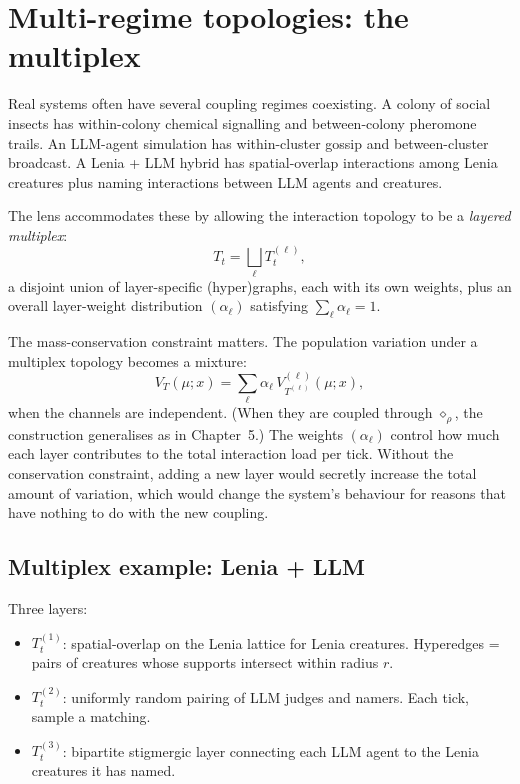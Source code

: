 \section{Multi-regime topologies: the multiplex}

Real systems often have several coupling regimes coexisting. A colony
of social insects has within-colony chemical signalling and
between-colony pheromone trails. An LLM-agent simulation has
within-cluster gossip and between-cluster broadcast. A Lenia + LLM
hybrid has spatial-overlap interactions among Lenia creatures plus
naming interactions between LLM agents and creatures.

The lens accommodates these by allowing the interaction topology to
be a \emph{layered multiplex}:
\[
  T_t = \bigsqcup_\ell T_t^{(\ell)},
\]
a disjoint union of layer-specific (hyper)graphs, each with its own
weights, plus an overall layer-weight distribution $(\alpha_\ell)$
satisfying $\sum_\ell \alpha_\ell = 1$.

The mass-conservation constraint matters. The population variation
under a multiplex topology becomes a mixture:
\[
  V_T(\mu; x) = \sum_\ell \alpha_\ell\, V_{T^{(\ell)}}^{(\ell)}(\mu;
  x),
\]
when the channels are independent. (When they are coupled through
$\diamond_\rho$, the construction generalises as in Chapter~5.) The
weights $(\alpha_\ell)$ control how much each layer contributes to the
total interaction load per tick. Without the conservation constraint,
adding a new layer would secretly increase the total amount of
variation, which would change the system's behaviour for reasons that
have nothing to do with the new coupling.

\subsection*{Multiplex example: Lenia + LLM}

Three layers:

\begin{itemize}[leftmargin=1.5em,itemsep=2pt]
  \item $T_t^{(1)}$: spatial-overlap on the Lenia lattice for Lenia
    creatures. Hyperedges = pairs of creatures whose supports
    intersect within radius $r$.
  \item $T_t^{(2)}$: uniformly random pairing of LLM judges and
    namers. Each tick, sample a matching.
  \item $T_t^{(3)}$: bipartite stigmergic layer connecting each LLM
    agent to the Lenia creatures it has named.
\end{itemize}

